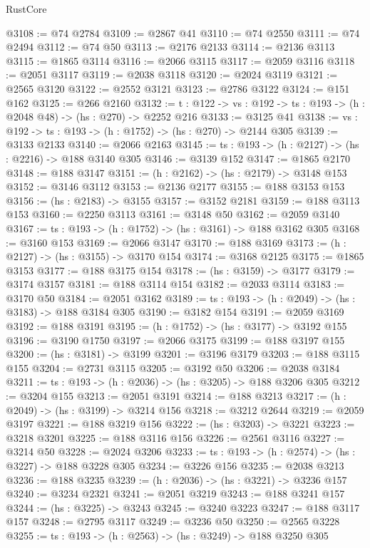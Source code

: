 \begin{lexlean}{RustCore}
\begin{coremodule}
@3108 := @74 @2784
@3109 := @2867 @41
@3110 := @74 @2550
@3111 := @74 @2494
@3112 := @74 @50
@3113 := @2176 @2133
@3114 := @2136 @3113
@3115 := @1865 @3114
@3116 := @2066 @3115
@3117 := @2059 @3116
@3118 := @2051 @3117
@3119 := @2038 @3118
@3120 := @2024 @3119
@3121 := @2565 @3120
@3122 := @2552 @3121
@3123 := @2786 @3122
@3124 := @151 @162
@3125 := @266 @2160
@3132 := {t : @122} -> {vs : @192} -> {ts : @193} -> (h : @2048 @48) -> (hs : @270) -> @2252 @216
@3133 := @3125 @41
@3138 := {vs : @192} -> {ts : @193} -> (h : @1752) -> (hs : @270) -> @2144 @305
@3139 := @3133 @2133
@3140 := @2066 @2163
@3145 := {ts : @193} -> (h : @2127) -> (hs : @2216) -> @188 @3140 @305
@3146 := @3139 @152
@3147 := @1865 @2170
@3148 := @188 @3147
@3151 := (h : @2162) -> (hs : @2179) -> @3148 @153
@3152 := @3146 @3112
@3153 := @2136 @2177
@3155 := @188 @3153 @153
@3156 := (hs : @2183) -> @3155
@3157 := @3152 @2181
@3159 := @188 @3113 @153
@3160 := @2250 @3113
@3161 := @3148 @50
@3162 := @2059 @3140
@3167 := {ts : @193} -> (h : @1752) -> (hs : @3161) -> @188 @3162 @305
@3168 := @3160 @153
@3169 := @2066 @3147
@3170 := @188 @3169
@3173 := (h : @2127) -> (hs : @3155) -> @3170 @154
@3174 := @3168 @2125
@3175 := @1865 @3153
@3177 := @188 @3175 @154
@3178 := (hs : @3159) -> @3177
@3179 := @3174 @3157
@3181 := @188 @3114 @154
@3182 := @2033 @3114
@3183 := @3170 @50
@3184 := @2051 @3162
@3189 := {ts : @193} -> (h : @2049) -> (hs : @3183) -> @188 @3184 @305
@3190 := @3182 @154
@3191 := @2059 @3169
@3192 := @188 @3191
@3195 := (h : @1752) -> (hs : @3177) -> @3192 @155
@3196 := @3190 @1750
@3197 := @2066 @3175
@3199 := @188 @3197 @155
@3200 := (hs : @3181) -> @3199
@3201 := @3196 @3179
@3203 := @188 @3115 @155
@3204 := @2731 @3115
@3205 := @3192 @50
@3206 := @2038 @3184
@3211 := {ts : @193} -> (h : @2036) -> (hs : @3205) -> @188 @3206 @305
@3212 := @3204 @155
@3213 := @2051 @3191
@3214 := @188 @3213
@3217 := (h : @2049) -> (hs : @3199) -> @3214 @156
@3218 := @3212 @2644
@3219 := @2059 @3197
@3221 := @188 @3219 @156
@3222 := (hs : @3203) -> @3221
@3223 := @3218 @3201
@3225 := @188 @3116 @156
@3226 := @2561 @3116
@3227 := @3214 @50
@3228 := @2024 @3206
@3233 := {ts : @193} -> (h : @2574) -> (hs : @3227) -> @188 @3228 @305
@3234 := @3226 @156
@3235 := @2038 @3213
@3236 := @188 @3235
@3239 := (h : @2036) -> (hs : @3221) -> @3236 @157
@3240 := @3234 @2321
@3241 := @2051 @3219
@3243 := @188 @3241 @157
@3244 := (hs : @3225) -> @3243
@3245 := @3240 @3223
@3247 := @188 @3117 @157
@3248 := @2795 @3117
@3249 := @3236 @50
@3250 := @2565 @3228
@3255 := {ts : @193} -> (h : @2563) -> (hs : @3249) -> @188 @3250 @305

\end{coremodule}
\end{lexlean}
